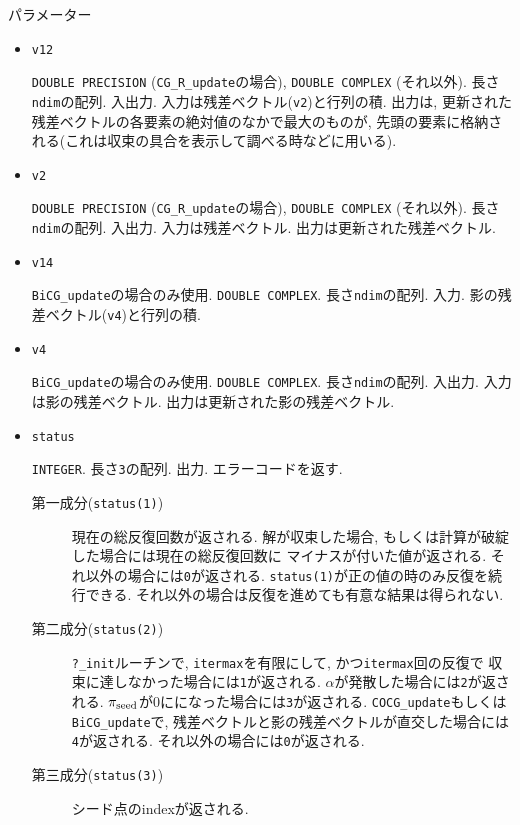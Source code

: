 \documentclass[12pt,titlepage]{jarticle}
\begin{document}
\noindent パラメーター

\begin{itemize}

\item \verb|v12|

  \verb|DOUBLE PRECISION| (\verb|CG_R_update|の場合),
  \verb|DOUBLE COMPLEX| (それ以外).
  長さ\verb|ndim|の配列. 入出力.
  入力は残差ベクトル(\verb|v2|)と行列の積.
  出力は, 更新された残差ベクトルの各要素の絶対値のなかで最大のものが,
  先頭の要素に格納される(これは収束の具合を表示して調べる時などに用いる).

\item \verb|v2|

  \verb|DOUBLE PRECISION| (\verb|CG_R_update|の場合),
  \verb|DOUBLE COMPLEX| (それ以外).
  長さ\verb|ndim|の配列. 入出力.
  入力は残差ベクトル.
  出力は更新された残差ベクトル.

\item \verb|v14|
  
  \verb|BiCG_update|の場合のみ使用. \verb|DOUBLE COMPLEX|.
  長さ\verb|ndim|の配列. 入力.
  影の残差ベクトル(\verb|v4|)と行列の積.
  
\item \verb|v4|
  
  \verb|BiCG_update|の場合のみ使用. \verb|DOUBLE COMPLEX|.
  長さ\verb|ndim|の配列. 入出力.
  入力は影の残差ベクトル.
  出力は更新された影の残差ベクトル.

\item \verb|status|

  \verb|INTEGER|. 長さ\verb|3|の配列. 出力. エラーコードを返す.
  \begin{description}
  \item [第一成分(\texttt{status(1)})]
    現在の総反復回数が返される.
    解が収束した場合, もしくは計算が破綻した場合には現在の総反復回数に
    マイナスが付いた値が返される.
    それ以外の場合には\verb|0|が返される.
    \verb|status(1)|が正の値の時のみ反復を続行できる.
    それ以外の場合は反復を進めても有意な結果は得られない.
    
  \item [第二成分(\texttt{status(2)})]
    \verb|?_init|ルーチンで, \verb|itermax|を有限にして, かつ\verb|itermax|回の反復で
    収束に達しなかった場合には\verb|1|が返される.
    $\alpha$が発散した場合には\verb|2|が返される.
    $\pi_{\rm seed}$が0にになった場合には\verb|3|が返される.
    \verb|COCG_update|もしくは\verb|BiCG_update|で,
    残差ベクトルと影の残差ベクトルが直交した場合には\verb|4|が返される.
    それ以外の場合には\verb|0|が返される.

  \item [第三成分(\texttt{status(3)})]
    シード点のindexが返される.
  \end{description}

\end{itemize}
\end{document}
